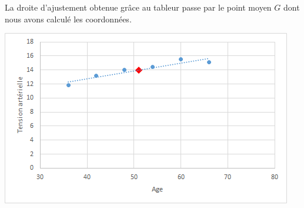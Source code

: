 \begin{myex}
	La droite d'ajustement obtenue grâce au tableur passe par le point moyen $G$ dont nous avons calculé les coordonnées.
	\begin{center}
		\includegraphics[scale =0.7]{./img/ex2}		
	\end{center}

\end{myex}